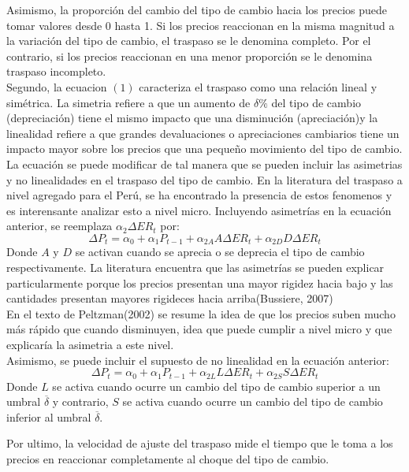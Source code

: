 \documentclass[12pt,a4paper,pdflatex]{article}
\begin{document}
Asimismo, la proporción del cambio del tipo de cambio hacia los precios puede tomar valores desde 0 hasta 1. Si los precios reaccionan en la misma magnitud a la variación del tipo de cambio, el traspaso se le denomina completo. Por el contrario, si los precios reaccionan en una menor proporción se le denomina traspaso incompleto. \\

Segundo, la ecuacion $(1)$ caracteriza el traspaso como una relación lineal y simétrica. La simetria refiere a que un aumento de $\delta \%$ del tipo de cambio (depreciación) tiene el mismo impacto que una disminución (apreciación)y la linealidad refiere a que grandes devaluaciones o apreciaciones cambiarios tiene un impacto mayor sobre los precios que una pequeño movimiento del tipo de cambio. La ecuación se puede modificar de tal manera que se pueden incluir las asimetrias y no linealidades en el traspaso del tipo de cambio. En la literatura del traspaso a nivel agregado para el Perú, se ha encontrado la presencia de estos fenomenos y es interensante analizar esto a nivel micro.
Incluyendo asimetrías en la ecuación anterior, se reemplaza $\alpha_{2}\Delta ER_{t}$ por:
\begin{equation}
  \Delta P_{t} = \alpha_{0} +\alpha_{1}P_{t-1} +\alpha_{2A}A\Delta ER_{t} + \alpha_{2D}D\Delta ER_{t}
\end{equation}
Donde $A$ y $D$ se activan cuando se aprecia o se deprecia el tipo de cambio respectivamente. La literatura encuentra que las asimetrías se pueden explicar particularmente porque los precios presentan una mayor rigidez hacia bajo y las cantidades presentan mayores rigideces hacia arriba(Bussiere, 2007) \\
En el texto de Peltzman(2002) se resume la idea de que los precios suben mucho más rápido que cuando disminuyen, idea que puede cumplir a nivel micro y que explicaría la asimetria a este nivel. \\
Asimismo, se puede incluir el supuesto de no linealidad en la ecuación anterior:
\begin{equation}
  \Delta P_{t} = \alpha_{0} +\alpha_{1}P_{t-1} +\alpha_{2L}L\Delta ER_{t} + \alpha_{2S}S\Delta ER_{t}
\end{equation}
Donde $L$ se activa cuando ocurre un cambio del tipo de cambio superior a un umbral $\overline{\delta}$ y contrario, $S$ se activa cuando ocurre un cambio del tipo de cambio inferior al umbral $\overline{\delta}$.

Por ultimo, la velocidad de ajuste del traspaso mide el tiempo que le toma a los precios en reaccionar completamente al choque del tipo de cambio. \\
\end{document}
